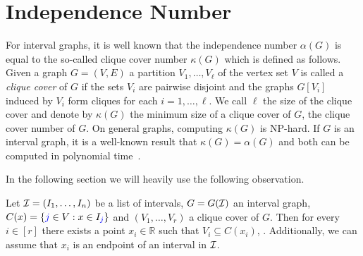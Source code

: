 \section{Independence Number}


For interval graphs, it is well known that the independence number $\alpha(G)$ is 
equal to the so-called clique cover number $\kappa(G)$ which is defined as follows.
Given a graph $G=(V,E)$ a partition $V_1, \dots, V_\ell$ of the vertex set $V$ is called a 
\emph{clique cover} of $G$ if the sets $V_i$ are pairwise disjoint and the graphs $G[V_i]$ induced by $V_i$
form cliques for each $i=1,\dots,\ell$. We call $\ell$ the size of the clique cover 
and denote by $\kappa(G)$ the minimum size of a clique cover of $G$, the clique cover number of $G$.
On general graphs, computing $\kappa(G)$ is NP-hard.
If $G$ is an interval graph, it is a well-known result that $\kappa(G) = \alpha(G)$ and both 
can be computed in polynomial time~\cite{golumbic2004algorithmic}.

In the following section we will heavily use the following observation.

\begin{proposition}\label{prop:cliquecover}
    Let $\mathcal{I} = (I_1, \dots, I_n)$ be a list of intervals, $G = G(\mathcal{I})$ an interval graph,
     $C(x) = \{\textcolor{blue}{j} \in V : x \in I_{\textcolor{blue}{j}}\}$ and $(V_1, \dots, V_{r})$ a clique cover of $G$.
    Then for every $i \in [r]$ there exists a point $x_{i} \in \mathbb{R}$
    such that $V_{i} \subseteq C(x_i)$, .
     Additionally, we can assume that $x_i$ is an endpoint of an interval in $\mathcal{I}$.
\end{proposition}

